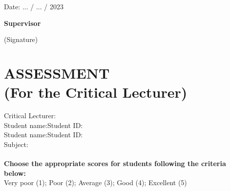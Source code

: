 \hspace{9cm} Date: ... / ... / 2023

\hspace{9.8cm}\textbf{Supervisor}

\vspace{-6pt}
\hspace{9.8cm}(Signature)
\cleardoublepage

\section*{ASSESSMENT\\\fontsize{14pt}{0pt}\selectfont \vspace{4pt}\textnormal{(For the Critical Lecturer)}}
\thispagestyle{empty}
\vspace{-16pt}
\hspace{-1cm}Critical Lecturer:\dotfill\\
Student name:\dotfill Student ID:\dotfill\\
Student name:\dotfill Student ID:\dotfill\\
Subject: \dotfill\\
\\
\textbf{Choose the appropriate scores for students following the criteria below:}\\
Very poor (1); Poor (2); Average (3); Good (4); Excellent (5) 

